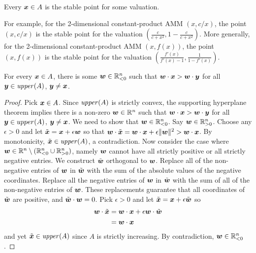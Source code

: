 \begin{axiom}[Stability]
Every ${\boldsymbol x} \in A$ is the stable point for some valuation.
\end{axiom}

For example,
for the 2-dimensional constant-product AMM $(x,c/x)$,
the point $(x,c/x)$ is the stable point for the
valuation $(\frac{c}{c+x^2},1-\frac{c}{c+x^2})$.
More generally,
for the 2-dimensional constant-product AMM $(x,f(x))$,
the point $(x,f(x))$ is the stable point for the
valuation $(\frac{f'(x)}{f'(x)-1},\frac{1}{1-f'(x)})$.

\begin{lemma}%
  For every ${\boldsymbol x} \in A$,
  there is some ${\boldsymbol w} \in \mathbb{R}_{<0}^n$ such that ${\boldsymbol w} \cdot {\boldsymbol x} > {\boldsymbol w} \cdot {\boldsymbol y}$ for all ${\boldsymbol y} \in \mathit{upper}(A)$, ${\boldsymbol y} \neq {\boldsymbol x}$. 
\end{lemma}

\begin{proof}
    Pick ${\boldsymbol x} \in A$. 
    Since $\mathit{upper}(A)$ is strictly convex,
    the supporting hyperplane theorem implies there is a non-zero
    ${\boldsymbol w} \in \mathbb{R}^{n}$ such that
    ${\boldsymbol w} \cdot {\boldsymbol x} > {\boldsymbol w} \cdot {\boldsymbol y}$ for all ${\boldsymbol y} \in upper(A)$, ${\boldsymbol y} \neq {\boldsymbol x}$.
    We need to show that ${\boldsymbol w} \in \mathbb{R}_{<0}^n$.
    Say ${\boldsymbol w} \in \mathbb{R}_{>0}^n$.
    Choose any $\epsilon > 0$ and let $\tilde{{\boldsymbol x}} = {\boldsymbol x} + \epsilon {\boldsymbol w}$
    so that ${\boldsymbol w} \cdot \tilde{{\boldsymbol x}} = {\boldsymbol w} \cdot {\boldsymbol x} + \epsilon\|{\boldsymbol w}\|^2 > {\boldsymbol w} \cdot {\boldsymbol x}$.
    By monotonicity, $\tilde{{\boldsymbol x}} \in \mathit{upper}(A)$, a contradiction.
    Now consider the case where ${\boldsymbol w} \in \mathbb{R}^n \setminus (\mathbb{R}_{<0}^n \cup \mathbb{R}_{>0}^n)$,
    namely ${\boldsymbol w}$ cannot have all strictly positive or all strictly negative entries.
    We construct $\tilde{{\boldsymbol w}}$ orthogonal to ${\boldsymbol w}$.
    Replace all of the non-negative entries of ${\boldsymbol w}$ in $\tilde{{\boldsymbol w}}$
    with the sum of the absolute values of the negative coordinates.
    Replace all the negative entries of ${\boldsymbol w}$ in $\tilde{{\boldsymbol w}}$
    with the sum of all of the non-negative entries of ${\boldsymbol w}$.
    These replacements guarantee that all coordinates of $\tilde{{\boldsymbol w}}$ are positive,
    and $\tilde{{\boldsymbol w}} \cdot {\boldsymbol w} = 0$.
    Pick $\epsilon > 0$ and let
    $\tilde{{\boldsymbol x}} = {\boldsymbol x} + \epsilon \tilde{{\boldsymbol w}}$
    so
    \begin{align*}
      {\boldsymbol w} \cdot \tilde{{\boldsymbol x}} 
      &= {\boldsymbol w} \cdot {\boldsymbol x} + \epsilon {\boldsymbol w} \cdot \tilde{{\boldsymbol w}} \\
      &= {\boldsymbol w} \cdot {\boldsymbol x}
    \end{align*}
and yet $\tilde{{\boldsymbol x}} \in \mathit{upper}(A)$ since $A$ is strictly increasing.
By contradiction, ${\boldsymbol w} \in \mathbb{R}_{<0}^n$.
\end{proof}

